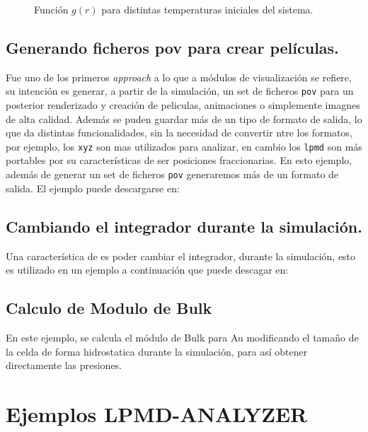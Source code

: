 \begin{figure}[!ht]
{ \label{fig:opogdr200}
}
\caption{Funci\'on $g(r)$ para distintas temperaturas iniciales del sistema.}
\label{fig:opogdr}
\end{figure}


\subsection{Generando ficheros pov para crear pel\'iculas.}

Fue uno de los primeros \textit{approach} a lo que a m\'odulos de visualizaci\'on se refiere, su intenci\'on es generar, a partir de la simulaci\'on, un set de ficheros \verb|pov| para un posterior renderizado y creaci\'on de peliculas, animaciones o simplemente imagnes de alta calidad. Adem\'as se puden guardar m\'as de un tipo de formato de salida, lo que da distintas funcionalidades, sin la necesidad de convertir ntre los formatos, por ejemplo, los \verb|xyz| son mas utilizados para analizar, en cambio los \verb|lpmd| son m\'as portables por su caracter\'isticas de ser posiciones fraccionarias. En esto ejemplo, adem\'as de generar un set de ficheros \verb|pov| generaremos m\'as de un formato de salida. El ejemplo puede descargarse en:



\subsection{Cambiando el integrador durante la simulaci\'on.}

Una caracter\'istica de \lpmd es poder cambiar el integrador, durante la simulaci\'on, esto es utilizado en un ejemplo a continuaci\'on que puede descagar en:


\subsection{Calculo de Modulo de Bulk}

En este ejemplo, se calcula el m\'odulo de Bulk para Au modificando el tama\~no de la celda de forma hidrostatica durante la simulaci\'on, para as\'i obtener directamente las presiones.

\section{Ejemplos LPMD-ANALYZER}


